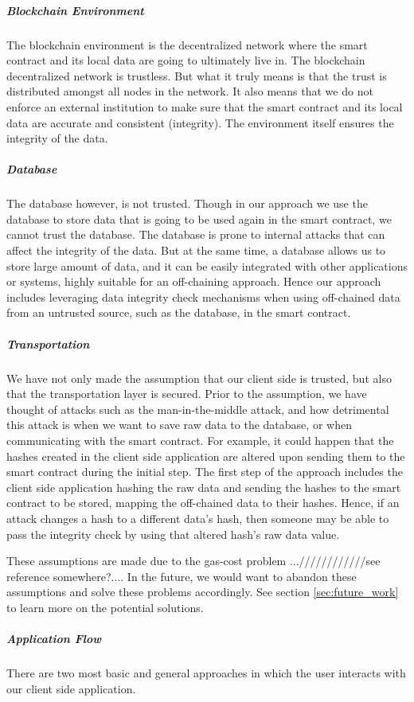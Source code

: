 \subparagraph{Blockchain Environment}
The blockchain environment is the decentralized network where the smart contract and its local data are going to ultimately live in. The blockchain decentralized network is trustless. But what it truly means is that the trust is distributed amongst all nodes in the network. It also means that we do not enforce an external institution to make sure that the smart contract and its local data are accurate and consistent (integrity). The environment itself ensures the integrity of the data.

\subparagraph{Database}
The database however, is not trusted. Though in our approach we use the database to store data that is going to be used again in the smart contract, we cannot trust the database. The database is prone to internal attacks that can affect the integrity of the data. But at the same time, a database allows us to store large amount of data, and it can be easily integrated with other applications or systems, highly suitable for an off-chaining approach. Hence our approach includes leveraging data integrity check mechanisms when using off-chained data from an untrusted source, such as the database, in the smart contract.

\subparagraph{Transportation}
We have not only made the assumption that our client side is trusted, but also that the transportation layer is secured. Prior to the assumption, we have thought of attacks such as the man-in-the-middle attack, and how detrimental this attack is when we want to save raw data to the database, or when communicating with the smart contract. For example, it could happen that the hashes created in the client side application are altered upon sending them to the smart contract during the initial step. The first step of the approach includes the client side application hashing the raw data and sending the hashes to the smart contract to be stored, mapping the off-chained data to their hashes. Hence, if an attack changes a hash to a different data’s hash, then someone may be able to pass the integrity check by using that altered hash’s raw data value.

These assumptions are made due to the gas-cost problem ...////////////see reference somewhere?.... In the future, we would want to abandon these assumptions and solve these problems accordingly. See section \ref{sec:future_work} to learn more on the potential solutions.

\subparagraph{Application Flow}
There are two most basic and general approaches in which the user interacts with our client side application. 

